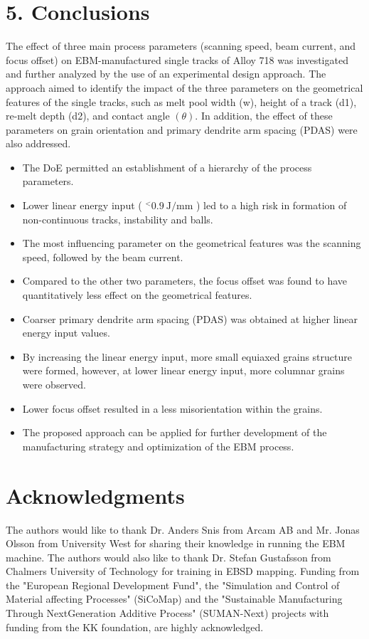 \documentclass[10pt]{article}
\begin{document}
\section*{5. Conclusions}
The effect of three main process parameters (scanning speed, beam current, and focus offset) on EBM-manufactured single tracks of Alloy 718 was investigated and further analyzed by the use of an experimental design approach. The approach aimed to identify the impact of the three parameters on the geometrical features of the single tracks, such as melt pool width (w), height of a track (d1), re-melt depth (d2), and contact angle $(\theta)$. In addition, the effect of these parameters on grain orientation and primary dendrite arm spacing (PDAS) were also addressed.

\begin{itemize}
  \item The DoE permitted an establishment of a hierarchy of the process parameters.
  \item Lower linear energy input ( ${ }^{<} 0.9 \mathrm{~J} / \mathrm{mm}$ ) led to a high risk in formation of non-continuous tracks, instability and balls.
  \item The most influencing parameter on the geometrical features was the scanning speed, followed by the beam current.
  \item Compared to the other two parameters, the focus offset was found to have quantitatively less effect on the geometrical features.
  \item Coarser primary dendrite arm spacing (PDAS) was obtained at higher linear energy input values.
  \item By increasing the linear energy input, more small equiaxed grains structure were formed, however, at lower linear energy input, more columnar grains were observed.
  \item Lower focus offset resulted in a less misorientation within the grains.
  \item The proposed approach can be applied for further development of the manufacturing strategy and optimization of the EBM process.
\end{itemize}

\section*{Acknowledgments}
The authors would like to thank Dr. Anders Snis from Arcam AB and Mr. Jonas Olsson from University West for sharing their knowledge in running the EBM machine. The authors would also like to thank Dr. Stefan Gustafsson from Chalmers University of Technology for training in EBSD mapping. Funding from the "European Regional Development Fund", the "Simulation and Control of Material affecting Processes" (SiCoMap) and the "Sustainable Manufacturing Through NextGeneration Additive Process" (SUMAN-Next) projects with funding from the KK foundation, are highly acknowledged.
\end{document}
